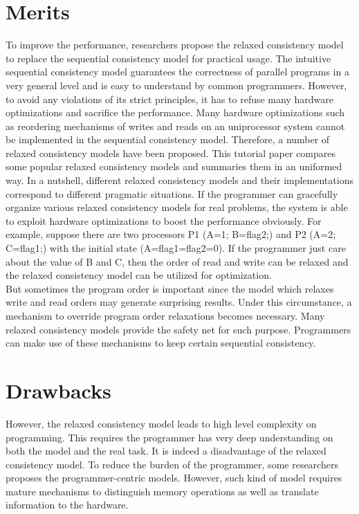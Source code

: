 \documentclass[10pt, letterpaper]{article}
\begin{document}
\section{Merits}
\label{sec-merits}
To improve the performance, researchers propose the relaxed consistency model to replace the sequential consistency model for practical usage. The intuitive sequential consistency model guarantees the correctness of parallel programs in a very general level and is easy to understand by common programmers. However, to avoid any violations of its strict principles, it has to refuse many hardware optimizations and sacrifice the performance. Many hardware optimizations such as reordering mechanisms of writes and reads on an uniprocessor system cannot be implemented in the sequential consistency model. Therefore, a number of relaxed consistency models have been proposed. This tutorial paper compares some popular relaxed consistency models and summaries them in an uniformed way. In a nutshell, different relaxed consistency models and their implementations correspond to different pragmatic situations. If the programmer can gracefully organize various relaxed consistency models for real problems, the system is able to exploit hardware optimizations to boost the performance obviously. For example, suppose there are two processors P1 (A=1; B=flag2;) and P2 (A=2; C=flag1;) with the initial state (A=flag1=flag2=0). If the programmer just care about the value of B and C, then the order of read and write can be relaxed and the relaxed consistency model can be utilized for optimization.
\\But sometimes the program order is important since the model which relaxes write and read orders may generate surprising results. Under this circumstance, a mechanism to override program order relaxations becomes necessary. Many relaxed consistency models provide the safety net for such purpose. Programmers can make use of these mechanisms to keep certain sequential consistency.

\section{Drawbacks}
\label{sec-drawbacks}
However, the relaxed consistency model leads to high level complexity on programming. This requires the programmer has very deep understanding on both the model and the real task. It is indeed a disadvantage of the relaxed consistency model. To reduce the burden of the programmer, some researchers proposes the programmer-centric models. However, such kind of model requires mature mechanisms to distinguish memory operations as well as translate information to the hardware.
\end{document}
